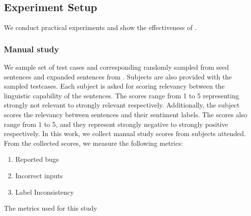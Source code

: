 \subsection{Experiment Setup}
We conduct practical experiments and show the effectiveness of
\tool.

\subsubsection{Manual study}
We sample set of test cases and corresponding \lc randomly sampled
from seed sentences and expanded sentences from \tool.  Subjects are
also provided with the sampled testcases. Each subject is asked for
scoring relevancy between the linguistic capability of the
sentences. The scores range from 1 to 5 representing strongly not
relevant to strongly relevant respectively. Additionally, the subject
scores the relevancy between sentences and their sentiment labels. The
scores also range from 1 to 5, and they represent strongly negative to
strongly positive respectively. In this work, we collect manual study
scores from {} subjects attended. From the collected scores, we
measure the following metrics:

\begin{enumerate}[label=\textbf{Metrics}]
\item \label{mm:one} Reported bugs
\item \label{mm:two} Incorrect inputs
\item \label{mm:three} Label Inconsistency
\end{enumerate}



The metrics used for this study





